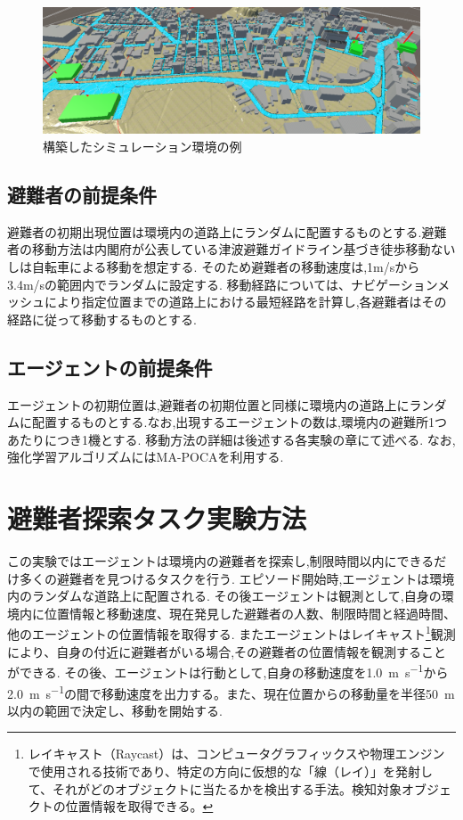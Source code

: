 \begin{figure}[H] 
  \centering 
  \includegraphics[width=1.0\textwidth]{Figures/2025-01-10 025916.png}
  \caption{構築したシミュレーション環境の例} 
  \label{fig:01} 
\end{figure}
\subsection{避難者の前提条件}
避難者の初期出現位置は環境内の道路上にランダムに配置するものとする.避難者の移動方法は内閣府が公表している津波避難ガイドライン基づき徒歩移動ないしは自転車による移動を想定する.
そのため避難者の移動速度は,1m/sから3.4m/sの範囲内でランダムに設定する.
移動経路については、ナビゲーションメッシュにより指定位置までの道路上における最短経路を計算し,各避難者はその経路に従って移動するものとする.
\subsection{エージェントの前提条件}
エージェントの初期位置は,避難者の初期位置と同様に環境内の道路上にランダムに配置するものとする.なお,出現するエージェントの数は,環境内の避難所1つあたりにつき1機とする.
移動方法の詳細は後述する各実験の章にて述べる.
なお,強化学習アルゴリズムにはMA-POCAを利用する.

\section{避難者探索タスク実験方法}
この実験ではエージェントは環境内の避難者を探索し,制限時間以内にできるだけ多くの避難者を見つけるタスクを行う.
エピソード開始時,エージェントは環境内のランダムな道路上に配置される.
その後エージェントは観測として,自身の環境内に位置情報と移動速度、現在発見した避難者の人数、制限時間と経過時間、他のエージェントの位置情報を取得する.
またエージェントはレイキャスト\footnote{レイキャスト（Raycast）は、コンピュータグラフィックスや物理エンジンで使用される技術であり、特定の方向に仮想的な「線（レイ）」を発射して、それがどのオブジェクトに当たるかを検出する手法。検知対象オブジェクトの位置情報を取得できる。}観測により、自身の付近に避難者がいる場合,その避難者の位置情報を観測することができる.
その後、エージェントは行動として,自身の移動速度を\SI{1.0}{\meter\per\second}から\SI{2.0}{\meter\per\second}の間で移動速度を出力する。また、現在位置からの移動量を半径\SI{50}{\meter}以内の範囲で決定し、移動を開始する.



